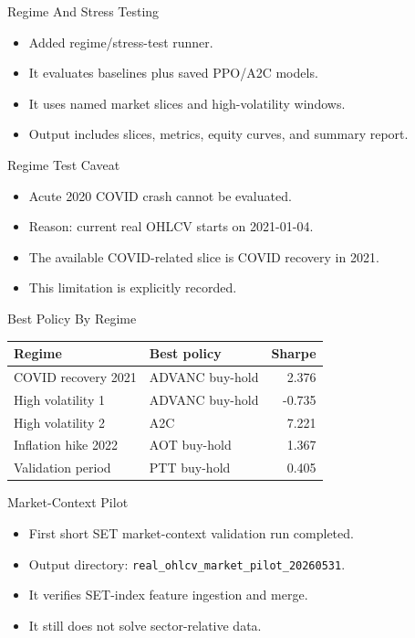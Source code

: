 \documentclass[aspectratio=43,10pt]{beamer}
\begin{document}
\begin{frame}{Regime And Stress Testing}
\begin{itemize}
  \item Added regime/stress-test runner.
  \item It evaluates baselines plus saved PPO/A2C models.
  \item It uses named market slices and high-volatility windows.
  \item Output includes slices, metrics, equity curves, and summary report.
\end{itemize}
\end{frame}

\begin{frame}{Regime Test Caveat}
\begin{itemize}
  \item Acute 2020 COVID crash cannot be evaluated.
  \item Reason: current real OHLCV starts on 2021-01-04.
  \item The available COVID-related slice is COVID recovery in 2021.
  \item This limitation is explicitly recorded.
\end{itemize}
\end{frame}

\begin{frame}{Best Policy By Regime}
\begin{center}
\begin{tabular}{llr}
\toprule
Regime & Best policy & Sharpe \\
\midrule
COVID recovery 2021 & ADVANC buy-hold & 2.376 \\
High volatility 1 & ADVANC buy-hold & -0.735 \\
High volatility 2 & A2C & 7.221 \\
Inflation hike 2022 & AOT buy-hold & 1.367 \\
Validation period & PTT buy-hold & 0.405 \\
\bottomrule
\end{tabular}
\end{center}
\end{frame}

\begin{frame}{Market-Context Pilot}
\begin{itemize}
  \item First short SET market-context validation run completed.
  \item Output directory: \texttt{real\_ohlcv\_market\_pilot\_20260531}.
  \item It verifies SET-index feature ingestion and merge.
  \item It still does not solve sector-relative data.
\end{itemize}
\end{frame}
\end{document}
